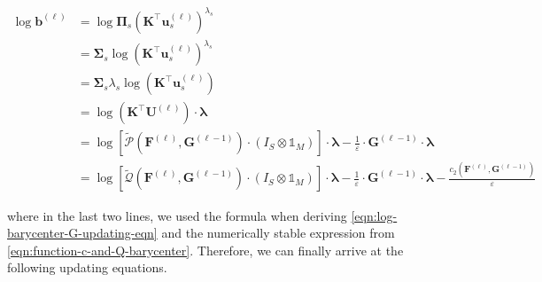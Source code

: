 \begin{equation*}
  \begin{aligned}
    \log \mathbf{b}^{(\ell)}
     & = \log\boldsymbol\Pi_{s} \left(\mathbf{K}^\top \mathbf{u}_s^{(\ell)}\right)^{\lambda_s}   \\
     & = \boldsymbol\Sigma_s \log \left(\mathbf{K}^\top \mathbf{u}^{(\ell)}_s\right)^{\lambda_s} \\
     & = \boldsymbol\Sigma_s \lambda_s \log \left(\mathbf{K}^\top \mathbf{u}^{(\ell)}_s\right)   \\
     & = \log \left(\mathbf{K}^\top \mathbf{U}^{(\ell)}\right) \cdot \boldsymbol\lambda          \\
     & = \log \left[
      \widetilde{\mathcal{P}} \left(\mathbf{F}^{(\ell)}, \mathbf{G}^{(\ell-1)}\right)
      \cdot \left(I_S \otimes \mathbb{1}_M\right)
      \right]
    \cdot \boldsymbol \lambda
    - \frac1\varepsilon \cdot \mathbf{G}^{(\ell-1)} \cdot \boldsymbol \lambda                    \\
     & = \log \left[
      \widetilde{\mathcal{Q}} \left(\mathbf{F}^{(\ell)}, \mathbf{G}^{(\ell-1)}\right)
      \cdot \left(I_S \otimes \mathbb{1}_M\right)
      \right] \cdot \boldsymbol \lambda
    - \frac1\varepsilon \cdot \mathbf{G}^{(\ell-1)} \cdot \boldsymbol \lambda
    - \frac{c_2 \left(\mathbf{F}^{(\ell)}, \mathbf{G}^{(\ell-1)}\right)}\varepsilon
  \end{aligned}
\end{equation*}

where in the last two lines, we used the formula when deriving \cref{eqn:log-barycenter-G-updating-eqn}
and the numerically stable expression from \cref{eqn:function-c-and-Q-barycenter}.
Therefore, we can finally arrive at the following updating equations.

